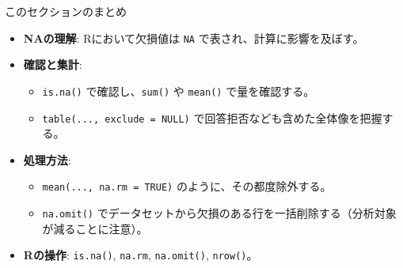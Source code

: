 \documentclass[
  ignorenonframetext,
]{beamer}
\providecommand{\tightlist}{%
  \setlength{\itemsep}{0pt}\setlength{\parskip}{0pt}}
\begin{document}
\begin{frame}[fragile]{このセクションのまとめ}
\protect\hypertarget{ux3053ux306eux30bbux30afux30b7ux30e7ux30f3ux306eux307eux3068ux3081}{}
\begin{itemize}
\tightlist
\item
  \textbf{NAの理解}: Rにおいて欠損値は \texttt{NA}
  で表され、計算に影響を及ぼす。
\item
  \textbf{確認と集計}:

  \begin{itemize}
  \tightlist
  \item
    \texttt{is.na()} で確認し、\texttt{sum()} や \texttt{mean()}
    で量を確認する。
  \item
    \texttt{table(...,\ exclude\ =\ NULL)}
    で回答拒否なども含めた全体像を把握する。
  \end{itemize}
\item
  \textbf{処理方法}:

  \begin{itemize}
  \tightlist
  \item
    \texttt{mean(...,\ na.rm\ =\ TRUE)} のように、その都度除外する。
  \item
    \texttt{na.omit()}
    でデータセットから欠損のある行を一括削除する（分析対象が減ることに注意）。
  \end{itemize}
\item
  \textbf{Rの操作}: \texttt{is.na()}, \texttt{na.rm},
  \texttt{na.omit()}, \texttt{nrow()}。
\end{itemize}
\end{frame}
\end{document}
